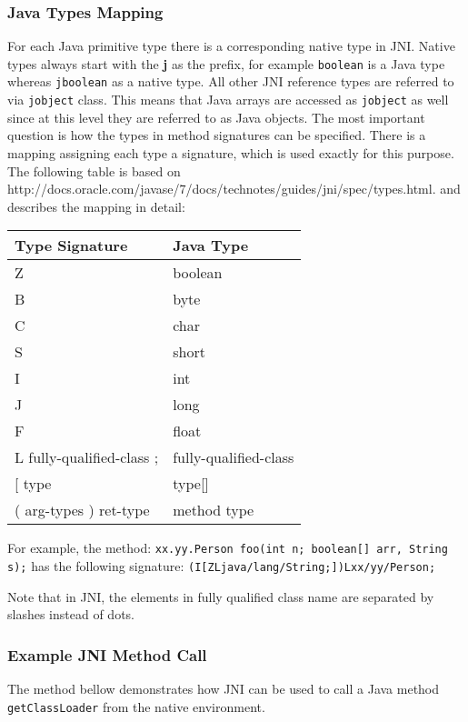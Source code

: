 \subsubsection{Java Types Mapping}
For each Java primitive type there is a corresponding native type in JNI. Native types always start with the \textbf{j} as the prefix, for example \texttt{boolean} is a Java type whereas \texttt{jboolean} as a native type.
All other JNI reference types are referred to via \texttt{jobject} class. This means that Java arrays are accessed as \texttt{jobject} as well since at this level they are referred to as Java objects. The most important question is how the types in method signatures can be specified. There is a mapping assigning each type a signature, which is used exactly for this purpose. The following table is based on http://docs.oracle.com/javase/7/docs/technotes/guides/jni/spec/types.html. and describes the mapping in detail:
\begin{center}
\begin{tabular}{ l l }
	  \hline
	  Type Signature & Java Type \\ \hline
	Z & boolean \\
	B & byte \\
	C & char \\
	S & short \\
	I & int \\
	J & long \\
	F & float \\
	L fully-qualified-class ; & fully-qualified-class \\
	{[} type & type{[]}\ \\
	( arg-types ) ret-type & method type \\
\end{tabular}
\end{center}

For example, the method: \newline \texttt{xx.yy.Person foo(int n; boolean[] arr, String s);} has the following signature:
\texttt{(I[ZLjava/lang/String;])Lxx/yy/Person;}

Note that in JNI, the elements in fully qualified class name are separated by slashes instead of dots.
\subsubsection{Example JNI Method Call}
The method bellow demonstrates how JNI can be used to call a Java method \texttt{getClassLoader} from the native environment.

